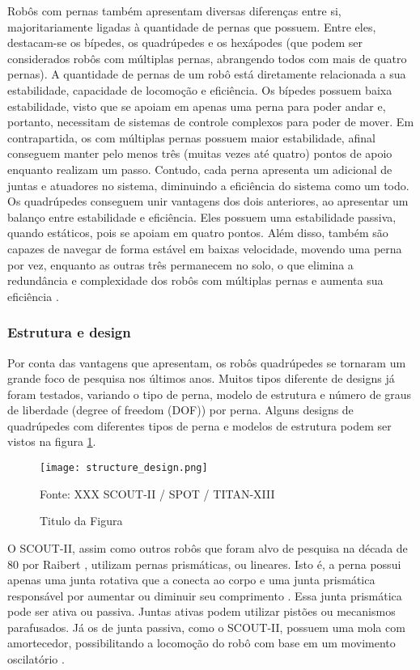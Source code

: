 \documentclass[../main.tex]{subfiles}
\begin{document}
  Robôs com pernas também apresentam diversas diferenças entre si, majoritariamente ligadas à quantidade de pernas que possuem. Entre eles, destacam-se os bípedes, os quadrúpedes e os hexápodes (que podem ser considerados robôs com múltiplas pernas, abrangendo todos com mais de quatro pernas). A quantidade de pernas de um robô está diretamente relacionada a sua estabilidade, capacidade de locomoção e eficiência. Os bípedes possuem baixa estabilidade, visto que se apoiam em apenas uma perna para poder andar e, portanto, necessitam de sistemas de controle complexos para poder de mover. Em contrapartida, os com múltiplas pernas possuem maior estabilidade, afinal conseguem manter pelo menos três (muitas vezes até quatro) pontos de apoio enquanto realizam um passo. Contudo, cada perna apresenta um adicional de juntas e atuadores no sistema, diminuindo a eficiência do sistema como um todo. Os quadrúpedes conseguem unir vantagens dos dois anteriores, ao apresentar um balanço entre estabilidade e eficiência. Eles possuem uma estabilidade passiva, quando estáticos, pois se apoiam em quatro pontos. Além disso, também são capazes de navegar de forma estável em baixas velocidade, movendo uma perna por vez, enquanto as outras três permanecem no solo, o que elimina a redundância e complexidade dos robôs com múltiplas pernas e aumenta sua eficiência \cite{Yao2021}.

  \subsubsection{Estrutura e design}
  Por conta das vantagens que apresentam, os robôs quadrúpedes se tornaram um grande foco de pesquisa nos últimos anos. Muitos tipos diferente de designs já foram testados, variando o tipo de perna, modelo de estrutura e número de graus de liberdade (degree of freedom (DOF)) por perna. Alguns designs de quadrúpedes com diferentes tipos de perna e modelos de estrutura podem ser vistos na figura \ref{fig:structure_design}.

  \begin{figure}[h]
    \centering
    \caption{Titulo da Figura}
    \texttt{[image: structure\_design.png]}
    
    Fonte: XXX
    SCOUT-II / SPOT / TITAN-XIII
    \label{fig:structure_design}
  \end{figure}

  O SCOUT-II, assim como outros robôs que foram alvo de pesquisa na década de 80 por Raibert \cite{Raibert1986}, utilizam pernas prismáticas, ou lineares. Isto é, a perna possui apenas uma junta rotativa que a conecta ao corpo e uma junta prismática responsável por aumentar ou diminuir seu comprimento \cite{Zhong2019}. Essa junta prismática pode ser ativa ou passiva. Juntas ativas podem utilizar pistões ou mecanismos parafusados. Já os de junta passiva, como o SCOUT-II, possuem uma mola com amortecedor, possibilitando a locomoção do robô com base em um movimento oscilatório \cite{Talebi2007}.
\end{document}
